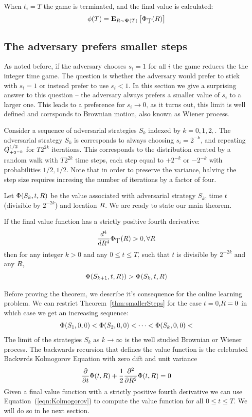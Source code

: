 \documentclass{article}[12pt]
\begin{document}
When $t_i=T$ the game is terminated, and the final value is calculated:
$$\phi(T) ={\bf E}_{R \sim {\bf \Psi}(T)}\left[ \Phi_{\mbox{T}}(R) \right]$$

\subsection{The adversary prefers smaller steps}
As noted before, if the adversary chooses $s_i=1$ for all $i$ the game
reduces the the integer time game. The question is whether the
adversary would prefer to stick with $s_i=1$ or instead prefer to use
$s_i<1$. In this section we give a surprising answer to this question
-- the adversary always prefers a smaller value of $s_i$ to a larger
one. This leads to a preference for $s_i \to 0$, as it turns out, this
limit is well defined and corrsponds to Brownian motion, also known as
Wiener process.

Consider a sequence of adversarial strategies $S_k$ indexed by
$k=0,1,2,$. The adversarial strategy $S_k$ is corresponds to always
choosing $s_i = 2^{-k}$, and repeating  $Q^{1/2}_{\pm 2^{-k}}$ 
for $T 2^{2k}$ iterations.
This corresponds to the distribution created by a random walk with
$T 2^{2k}$ time steps, each step equal to $+2^{-k}$ or  $-2^{-k}$ with probabilities $1/2,1/2$.
Note that in order to preserve the variance, halving the step size
requires incresing the number of iterations by a factor of four.

Let $\Phi(S_k,t,R)$ be the value associated with adversarial
strategy $S_k$, time $t$ (divisible by $2^{-2k}$) and
location $R$. We are ready to state our main theorem.

\begin{theorem}\label{thm:smallerSteps}
  If the final value function has a strictly positive fourth
  derivative:
  $$ \frac{d^4}{d R^4} \Phi_{\mbox{T}}(R) >0, \forall R$$
  then for any integer $k>0$ and any $0 \leq  t \leq T$, such that $t$
  is divisible by
  $2^{-2k}$ and any $R$,
  $$\Phi(S_{k+1},t,R)) >  \Phi(S_{k},t,R)$$
\end{theorem}

Before proving the theorem, we describe it's
consequence for the online learning problem.
We can restrict Theorem~\ref{thm:smallerSteps} for the
case $t=0$,$R=0$ in which case we get an increasing sequence:
\[
\Phi(S_1,0,0) < \Phi(S_2,0,0) <\cdots <\Phi(S_k,0,0) <
\]
The limit of the strategies $S_k$ as $k \to \infty$ is the well
studied Brownian or Wiener process. The backwards recursion that
defines the value function is the celebrated Backwrds Kolmogorov
Equation with zero dift and unit variance
\begin{equation} \label{eqn:Kolmogorov}
  \frac{\partial}{\partial t} \Phi(t,R)
  + \frac{1}{2} \frac{\partial^2}{\partial R^2} \Phi(t,R)=0
\end{equation}
Given a final value function with a strictly positive fourth
derivative we can use Equation~(\ref{eqn:Kolmogorov}) to compute the
value function for all $0 \leq t \leq T$. We will do so in he next section.
\end{document}

